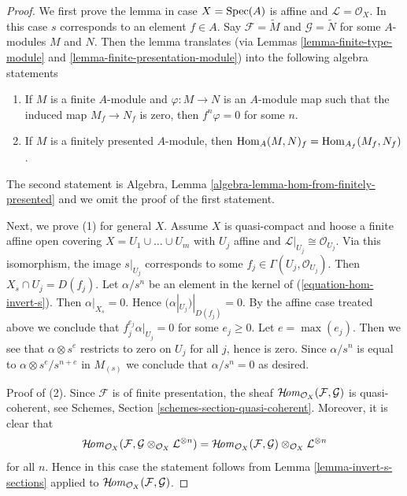 \begin{proof}
We first prove the lemma in case $X = \mathop{\mathrm{Spec}}(A)$ is affine
and $\mathcal{L} = \mathcal{O}_X$. In this case $s$ corresponds
to an element $f \in A$. Say
$\mathcal{F} = \widetilde{M}$ and $\mathcal{G} = \widetilde{N}$
for some $A$-modules $M$ and $N$. Then the lemma translates
(via Lemmas \ref{lemma-finite-type-module} and
\ref{lemma-finite-presentation-module}) into
the following algebra statements
\begin{enumerate}
\item If $M$ is a finite $A$-module and $\varphi : M \to N$ is
an $A$-module map such that the induced map $M_f \to N_f$ is zero,
then $f^n\varphi = 0$ for some $n$.
\item If $M$ is a finitely presented $A$-module, then
$\mathop{\mathrm{Hom}}\nolimits_A(M, N)_f = \mathop{\mathrm{Hom}}\nolimits_{A_f}(M_f, N_f)$.
\end{enumerate}
The second statement is
Algebra, Lemma \ref{algebra-lemma-hom-from-finitely-presented} and we omit
the proof of the first statement.

\medskip\noindent
Next, we prove (1) for general $X$.
Assume $X$ is quasi-compact and hoose a finite affine open covering
$X = U_1 \cup \ldots \cup U_m$ with $U_j$ affine and
$\mathcal{L}|_{U_j} \cong \mathcal{O}_{U_j}$. Via this isomorphism,
the image $s|_{U_j}$ corresponds to some
$f_j \in \Gamma(U_j, \mathcal{O}_{U_j})$. Then
$X_s \cap U_j = D(f_j)$.
Let $\alpha/s^n$ be an element in the kernel of
(\ref{equation-hom-invert-s}). Then $\alpha|_{X_s} = 0$.
Hence $(\alpha|_{U_j})|_{D(f_j)} = 0$. By the affine case treated above
we conclude that $f_j^{e_j} \alpha|_{U_j} = 0$ for some
$e_j \geq 0$. Let $e = \max(e_j)$. Then we see that $\alpha \otimes s^e$
restricts to zero on $U_j$ for all $j$, hence is zero. Since $\alpha/s^n$
is equal to $\alpha \otimes s^e/s^{n + e}$ in $M_{(s)}$ we conclude that
$\alpha/s^n = 0$ as desired.

\medskip\noindent
Proof of (2). Since $\mathcal{F}$ is of finite presentation, the
sheaf $\mathop{\mathcal{H}\!\mathit{om}}\nolimits_{\mathcal{O}_X}(\mathcal{F}, \mathcal{G})$ is
quasi-coherent, see Schemes, Section \ref{schemes-section-quasi-coherent}.
Moreover, it is clear that
$$
\mathop{\mathcal{H}\!\mathit{om}}\nolimits_{\mathcal{O}_X}(\mathcal{F},
\mathcal{G} \otimes_{\mathcal{O}_X} \mathcal{L}^{\otimes n}) =
\mathop{\mathcal{H}\!\mathit{om}}\nolimits_{\mathcal{O}_X}(\mathcal{F}, \mathcal{G})
\otimes_{\mathcal{O}_X} \mathcal{L}^{\otimes n}
$$
for all $n$. Hence in this case the statement follows from
Lemma \ref{lemma-invert-s-sections} applied to
$\mathop{\mathcal{H}\!\mathit{om}}\nolimits_{\mathcal{O}_X}(\mathcal{F}, \mathcal{G})$.
\end{proof}





